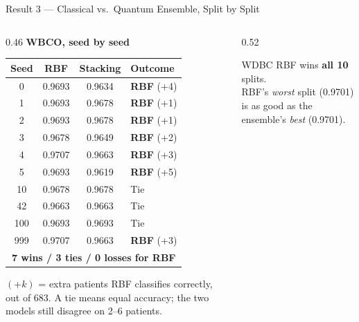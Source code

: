 \documentclass[aspectratio=169,11pt,t,xcolor={table}]{beamer}
\begin{document}
\begin{frame}{Result 3 --- Classical vs.\ Quantum Ensemble, Split by Split}
  \begin{columns}[T,onlytextwidth]
    \begin{column}{0.46\textwidth}
      \centering
      {\footnotesize\bfseries WBCO, seed by seed}\par\vspace{1mm}
      \scriptsize
      \renewcommand{\arraystretch}{0.98}
      \begin{tabular}{@{}cccl@{}}
        \toprule
        Seed & RBF & Stacking & Outcome \\
        \midrule
        0   & 0.9693 & 0.9634 & \textcolor{qnavy}{\textbf{RBF} (+4)} \\
        1   & 0.9693 & 0.9678 & \textcolor{qnavy}{\textbf{RBF} (+1)} \\
        2   & 0.9693 & 0.9678 & \textcolor{qnavy}{\textbf{RBF} (+1)} \\
        3   & 0.9678 & 0.9649 & \textcolor{qnavy}{\textbf{RBF} (+2)} \\
        4   & 0.9707 & 0.9663 & \textcolor{qnavy}{\textbf{RBF} (+3)} \\
        5   & 0.9693 & 0.9619 & \textcolor{qnavy}{\textbf{RBF} (+5)} \\
        10  & 0.9678 & 0.9678 & \textcolor{qgray}{Tie} \\
        42  & 0.9663 & 0.9663 & \textcolor{qgray}{Tie} \\
        100 & 0.9693 & 0.9693 & \textcolor{qgray}{Tie} \\
        999 & 0.9707 & 0.9663 & \textcolor{qnavy}{\textbf{RBF} (+3)} \\
        \midrule
        \multicolumn{4}{c}{\textbf{7 wins / 3 ties / 0 losses for RBF}}\\
        \bottomrule
      \end{tabular}\par
      {\tiny $(+k)$ = extra patients RBF classifies correctly, out of 683. A tie means equal accuracy; the two models still disagree on 2--6 patients.\par}
    \end{column}
    \begin{column}{0.52\textwidth}
      \begin{block}{WDBC}
        \footnotesize RBF wins \textbf{all 10} splits.\\
        RBF's \emph{worst} split (0.9701) is as good as the ensemble's \emph{best} (0.9701).
      \end{block}

\end{column}
\end{columns}
\end{frame}
\end{document}
